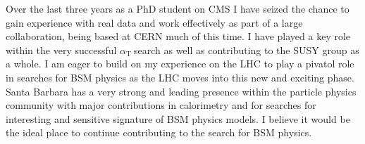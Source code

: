 \documentclass[11pt]{article}
\theoremstyle{plain} \numberwithin{equation}{section}
\theoremstyle{definition}
\DeclareRobustCommand{\alphat}{$\alpha_{\text{T}}~$}
\begin{document}
Over the last three years as a PhD student on CMS I have seized the chance to gain experience with real data
and work effectively as part of a large collaboration, being based at CERN much of this time. I have played 
a key role within the very successful \alphat search as well as contributing to the SUSY group as a whole.
I am eager to build on my experience on the LHC to play a pivatol role in searches for BSM physics as the LHC
moves into this new and exciting phase. Santa Barbara has a very strong and leading presence within the particle
physics community with major contributions in calorimetry and for searches for interesting and sensitive signature
of BSM physics models. I believe it would be the ideal place to continue contributing to the search for BSM physics.

\end{document}
